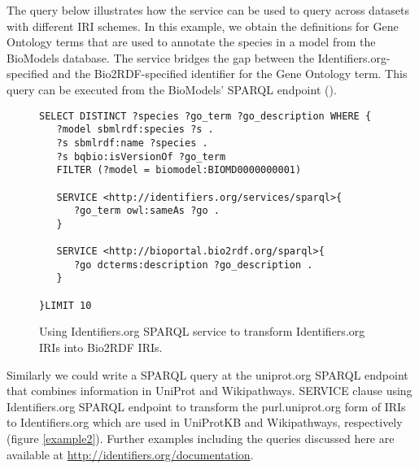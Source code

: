 \documentclass{bioinfo}
\begin{document}
The query below illustrates how the service can be used to query across datasets with different IRI schemes. In this example, we obtain the definitions for Gene Ontology terms that are used to annotate the species in a model from the BioModels database. The service bridges the gap between the Identifiers.org-specified and the Bio2RDF-specified identifier for the Gene Ontology term. This query can be executed from the BioModels' SPARQL endpoint (\cite{Wimalaratne2014}).

\begin{figure}[h]
{\scriptsize
\begin{verbatim}
SELECT DISTINCT ?species ?go_term ?go_description WHERE {
   ?model sbmlrdf:species ?s . 
   ?s sbmlrdf:name ?species .
   ?s bqbio:isVersionOf ?go_term 
   FILTER (?model = biomodel:BIOMD0000000001)

   SERVICE <http://identifiers.org/services/sparql>{
      ?go_term owl:sameAs ?go .
   }

   SERVICE <http://bioportal.bio2rdf.org/sparql>{
      ?go dcterms:description ?go_description .
   }
   
}LIMIT 10
\end{verbatim}
}
\caption{Using Identifiers.org SPARQL service to transform Identifiers.org IRIs into Bio2RDF IRIs.}
\label{example1}
\end{figure}

Similarly we could write a SPARQL query at the uniprot.org SPARQL endpoint that combines information in UniProt and Wikipathways. SERVICE clause using Identifiers.org SPARQL endpoint to transform the purl.uniprot.org form of IRIs to Identifiers.org which are used in UniProtKB and Wikipathways, respectively (figure \ref{example2}). Further examples including the queries discussed here are available at \href{http://identifiers.org/documentation}{http://identifiers.org/documentation}.
\end{document}
